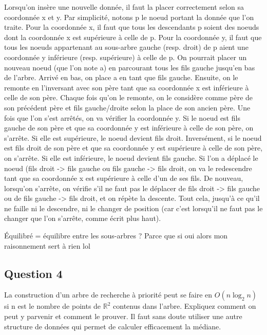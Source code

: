 \documentclass{article}
\newcommand{\black}{\color{black}}
\begin{document}
Lorsqu'on insère une nouvelle donnée, il faut la placer correctement selon sa coordonnée x et y. 
Par simplicité, notons p le noeud portant la donnée que l'on traite. 
Pour la coordonnée x, il faut que tous les descendants p soient des noeuds dont la coordonnée x est supérieure à celle de p. Pour la coordonnée y, 
il faut que tous les noeuds appartenant au sous-arbre gauche (resp. droit) de p aient une coordonnée y inférieure (resp. supérieure) à celle de p. 
On pourrait placer un nouveau noeud (que l'on note a) en parcourant tous les fils gauche jusqu'en bas de l'arbre. Arrivé en bas, on place a en tant que fils gauche. 
Ensuite, on le remonte en l'inversant avec son père tant que sa coordonnée x est inférieure à celle de son père. 
Chaque fois qu'on le remonte, on le considère comme père de son précédent père et fils gauche/droite selon la place de son ancien père. 
Une fois que l'on s'est arrêtés, on va vérifier la coordonnée y. Si le noeud est fils gauche de son père et que sa coordonnée y est inférieure à celle de son père, on s'arrête. 
Si elle est supérieure, le noeud devient fils droit. Inversément, si le noeud est fils droit de son père et que sa coordonnée y est supérieure à celle de son père, on s'arrête. 
Si elle est inférieure, le noeud devient fils gauche. Si l'on a déplacé le noeud (fils droit -> fils gauche ou fils gauche -> fils droit, 
on va le redescendre tant que sa coordonnée x est supérieure à celle d'un de ses fils. De nouveau, lorsqu'on s'arrête, 
on vérifie s'il ne faut pas le déplacer de fils droit -> fils gauche ou de fils gauche -> fils droit,
et on répète la descente. Tout cela, jusqu'à ce qu'il ne faille ni le descendre, ni le changer de position 
(car c'est lorsqu'il ne faut pas le changer que l'on s'arrête, comme écrit plus haut). 

Équilibré = équilibre entre les sous-arbres ? Parce que si oui alors mon raisonnement sert à rien lol

\black


\subsection{Question 4} La construction d'un arbre de recherche à priorité peut se faire en $O(n \log_2 n)$ si n est le nombre de points de $\mathbb{R}^2$ contenus dans l'arbre. 
Expliquez comment on peut y parvenir et comment le prouver. 
Il faut sans doute utiliser une autre structure de données qui permet de calculer efficacement la médiane.

\bigskip
\end{document}
